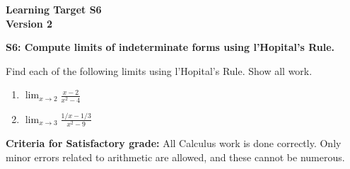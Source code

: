 \documentclass[10pt]{article}
\begin{document}
	\vspace*{0in}

		\begin{center}
			\textbf{Learning Target S6 \\
			Version 2} 
		\end{center}


\begin{framed}
	\textbf{S6: Compute limits of indeterminate forms using l'Hopital's Rule.}
\end{framed}

Find each of the following limits using l'Hopital's Rule. Show all work. 

\begin{enumerate}
    \item $\displaystyle{ \lim_{x \rightarrow 2} \frac{x-2}{x^2-4}}$
    \item $\displaystyle{  \lim_{x \rightarrow 3} \frac{ 1/x - 1/3 }{ x^2-9 }   }$
\end{enumerate}

\vfill


\begin{small}
    \begin{framed}
        	\textbf{Criteria for Satisfactory grade:} All Calculus work is done correctly. Only minor errors related to arithmetic are allowed, and these cannot be numerous. 
    \end{framed}

\end{small}
\end{document}
